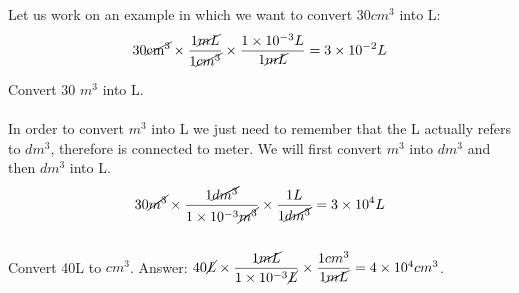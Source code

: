 \documentclass[main.tex]{subfiles}
\begin{document}
\begin{description}
Let us work on an example in which we want to convert $30cm^3$ into L:
 \begin{equation*}
30\cancel{\text{cm}^3} \times \dfrac{1\cancel{mL} }{1\cancel{cm^3}}\times \dfrac{1\times 10^{-3}L }{1\cancel{mL}} =3\times 10^{-2}L
\end{equation*}


\begin{example} %
Convert 30 $m^3$ into L.\\
\\
In order to convert $m^3$ into L we just need to remember that the L actually refers to $dm^3$, therefore is connected to meter. We will first convert $m^3$ into $dm^3$ and then $dm^3$ into L.
 \begin{equation*}
30\cancel{m^3} \times \dfrac{1 \cancel{dm^3}}{1\times10^{-3}\cancel{m^3}}   \times  \dfrac{1L}{1\cancel{dm^3}} =3\times 10^{4}L
\end{equation*}
\faDiamond\ \\
Convert 40L to $cm^3$.
\flushright Answer: $40\cancel{L} \times \dfrac{1\cancel{mL}}{1\times10^{-3}\cancel{L}} \times \dfrac{1cm^3}{1\cancel{mL}}=4\times 10^4cm^3$.
\end{example}%


\end{description}
\end{document}
